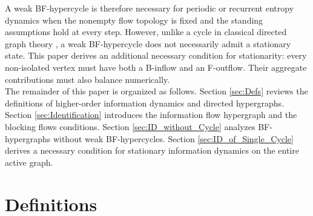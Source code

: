 \documentclass{comnet}%
\begin{document}
A weak BF-hypercycle is therefore necessary for periodic or recurrent entropy dynamics when the nonempty flow topology is fixed and the standing assumptions hold at every step. However, unlike a cycle in classical directed graph theory \cite{Diestel2017,Kleinberg2005}, a weak BF-hypercycle does not necessarily admit a stationary state. This paper derives an additional necessary condition for stationarity: every non-isolated vertex must have both a B-inflow and an F-outflow. Their aggregate contributions must also balance numerically.\\

The remainder of this paper is organized as follows. Section \ref{sec:Defs} reviews the definitions of higher-order information dynamics and directed hypergraphs. Section \ref{sec:Identification} introduces the information flow hypergraph and the blocking flows conditions. Section \ref{sec:ID_without_Cycle} analyzes BF-hypergraphs without weak BF-hypercycles. Section \ref{sec:ID_of_Single_Cycle} derives a necessary condition for stationary information dynamics on the entire active graph.\\

\section{\label{sec:Defs} Definitions}
\end{document}
